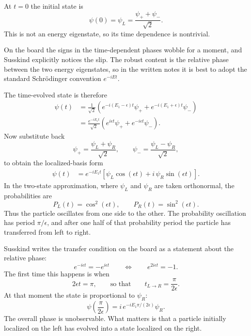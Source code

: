 At \(t=0\) the initial state is
\begin{equation}
\psi(0)=\psi_L=\frac{\psi_+ + \psi_-}{\sqrt{2}}.
\end{equation}
This is not an energy eigenstate, so its time dependence is nontrivial.

\begin{remark}
On the board the signs in the time-dependent phases wobble for a moment, and Susskind explicitly notices the slip. The robust content is the relative phase between the two energy eigenstates, so in the written notes it is best to adopt the standard Schr\"odinger convention \(e^{-iEt}\).
\end{remark}

The time-evolved state is therefore
\begin{align}
\psi(t)
&= \frac{1}{\sqrt{2}}\left(e^{-i(E_1-\epsilon)t}\psi_+ + e^{-i(E_1+\epsilon)t}\psi_-\right) \\
&= \frac{e^{-iE_1 t}}{\sqrt{2}}\left(e^{i\epsilon t}\psi_+ + e^{-i\epsilon t}\psi_-\right).
\end{align}
Now substitute back
\[
\psi_+ = \frac{\psi_L+\psi_R}{\sqrt{2}},
\qquad
\psi_- = \frac{\psi_L-\psi_R}{\sqrt{2}},
\]
to obtain the localized-basis form
\begin{align}
\psi(t)
&= e^{-iE_1 t}\left[\psi_L\cos(\epsilon t) + i\,\psi_R\sin(\epsilon t)\right].
\end{align}
In the two-state approximation, where \(\psi_L\) and \(\psi_R\) are taken orthonormal, the probabilities are
\begin{equation}
P_L(t)=\cos^2(\epsilon t),
\qquad
P_R(t)=\sin^2(\epsilon t).
\end{equation}
Thus the particle oscillates from one side to the other. The probability oscillation has period \(\pi/\epsilon\), and after one half of that probability period the particle has transferred from left to right.

Susskind writes the transfer condition on the board as a statement about the relative phase:
\begin{equation}
e^{-i\epsilon t}=-e^{i\epsilon t}
\qquad \Longleftrightarrow \qquad
e^{2i\epsilon t}=-1.
\end{equation}
The first time this happens is when
\begin{equation}
2\epsilon t=\pi,
\qquad\text{so that}\qquad
t_{L\to R}=\frac{\pi}{2\epsilon}.
\end{equation}
At that moment the state is proportional to \(\psi_R\):
\begin{equation}
\psi\!\left(\frac{\pi}{2\epsilon}\right)
= i\,e^{-iE_1\pi/(2\epsilon)}\psi_R.
\end{equation}
The overall phase is unobservable. What matters is that a particle initially localized on the left has evolved into a state localized on the right.

